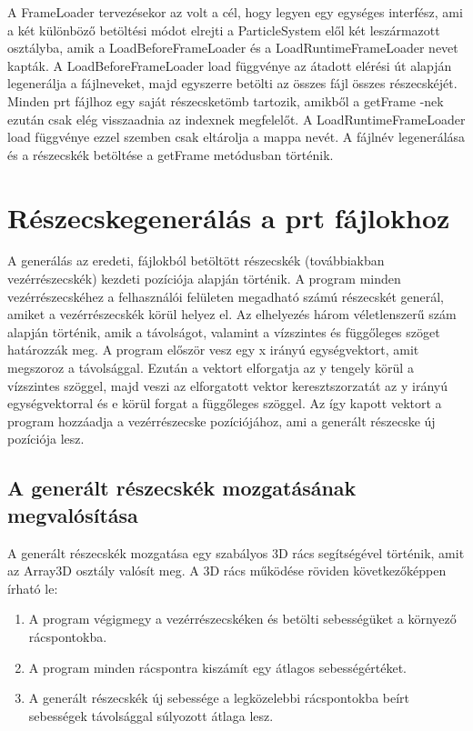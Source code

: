 A {\ttfamily FrameLoader} tervezésekor az volt a cél, 
hogy legyen egy egységes interfész, 
ami a két különböző betöltési módot 
elrejti a {\ttfamily ParticleSystem} elől 
két leszármazott osztályba, 
amik a {\ttfamily LoadBeforeFrameLoader} és a 
{\ttfamily LoadRuntimeFrameLoader} nevet kapták. 
A {\ttfamily LoadBeforeFrameLoader} {\ttfamily load} 
függvénye az átadott elérési út alapján legenerálja a fájlneveket, 
majd egyszerre betölti az összes fájl összes részecskéjét.
Minden prt fájlhoz egy saját részecsketömb tartozik, 
amikből a getFrame -nek ezután csak elég visszaadnia az indexnek megfelelőt.
A {\ttfamily LoadRuntimeFrameLoader} {\ttfamily load} 
függvénye ezzel szemben csak eltárolja a mappa nevét. 
A fájlnév legenerálása és a részecskék betöltése a {\ttfamily getFrame} 
metódusban történik.

\section{Részecskegenerálás a prt fájlokhoz}

A generálás az eredeti, 
fájlokból betöltött részecskék (továbbiakban vezérrészecskék) 
kezdeti pozíciója alapján történik. 
A program minden vezérrészecskéhez a felhasználói felületen 
megadható számú részecskét generál, 
amiket a vezérrészecskék körül helyez el. 
Az elhelyezés három véletlenszerű szám alapján történik, 
amik a távolságot, 
valamint a vízszintes és függőleges szöget határozzák meg. 
A program először vesz egy x irányú egységvektort, 
amit megszoroz a távolsággal. 
Ezután a vektort elforgatja az y tengely körül a vízszintes szöggel, 
majd veszi az elforgatott vektor keresztszorzatát 
az y irányú egységvektorral és 
e körül forgat a függőleges szöggel. 
Az így kapott vektort a program hozzáadja a vezérrészecske pozíciójához, 
ami a generált részecske új pozíciója lesz.

\subsection{A generált részecskék mozgatásának megvalósítása}

A generált részecskék mozgatása egy szabályos 3D rács segítségével történik, 
amit az {\ttfamily Array3D} osztály valósít meg. 
A 3D rács működése röviden következőképpen írható le:
\begin{enumerate}
\item A program végigmegy a vezérrészecskéken 
és betölti sebességüket a környező rácspontokba.
\item A program minden rácspontra kiszámít 
egy átlagos sebességértéket.
\item A generált részecskék új sebessége 
a legközelebbi rácspontokba beírt sebességek 
távolsággal súlyozott átlaga lesz.
\end{enumerate}

